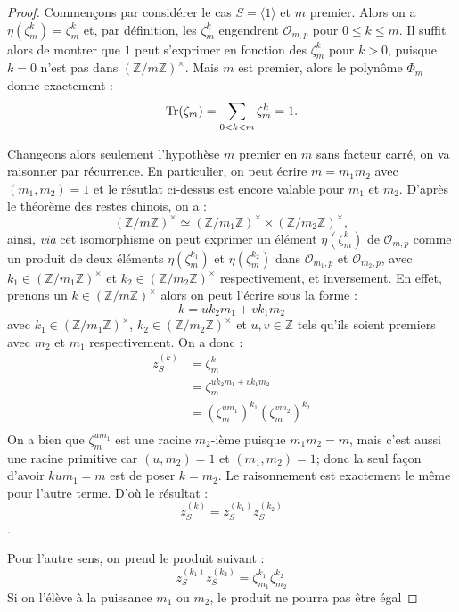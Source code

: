 \documentclass[a4paper]{article} %
\numberwithin{section}{part}
\numberwithin{equation}{section}
\newcommand\nroot[1]{\textit{#1}-ième}
\newcommand\zmodninv[1]{(\mathbb{Z}/#1\mathbb{Z})^{\times}}
\newcommand\EO{\mathcal{O}}
\begin{document}
\begin{proof}

Commençons par considérer le cas $S = \langle1\rangle$ et $m$ premier. Alors on 
a $\eta(\zeta_m^k) = \zeta_m^k$ et, par définition, les $\zeta_m^k$ engendrent 
$\EO_{m,p}$ pour $0 \leq k\leq m$. Il suffit alors de montrer que $1$ peut 
s'exprimer en fonction des $\zeta_m^k$ pour $k > 0$, puisque $k = 0$ n'est pas 
dans $\zmodninv{m}$. Mais $m$ est premier, alors le polynôme $\Phi_m$ 
donne exactement :
\begin{equation}
\textup{Tr}(\zeta_m) = \sum_{0 < k < m}{\zeta_m^k} = 1.
\end{equation}

Changeons alors seulement l'hypothèse $m$ premier en $m$ sans facteur carré, on 
va raisonner par récurrence. En particulier, on peut écrire $m = m_1m_2$ avec 
$(m_1,m_2) = 1$ et le résutlat ci-dessus est encore valable pour $m_1$ et 
$m_2$. D'après le théorème des restes chinois, on a :
\[\zmodninv{m} \simeq \zmodninv{m_1} \times \zmodninv{m_2},\]
ainsi, \textit{via} cet isomorphisme on peut exprimer un élément
$\eta(\zeta_m^k)$ de $\EO_{m,p}$ comme un produit de deux éléments
$\eta(\zeta_m^{k_1})$ et $\eta(\zeta_m^{k_2})$ dans $\EO_{m_1,p}$ et 
$\EO_{m_2,p}$, avec $k_1\in\zmodninv{m_1}$ et $k_2\in\zmodninv{m_2}$ 
respectivement, et inversement.
\iffalse
En effet, prenons un $k\in\zmodninv{m}$ alors on peut l'écrire sous la forme :
\[k = uk_2m_1 + vk_1m_2\]
avec $k_1\in\zmodninv{m_1}$, $k_2\in\zmodninv{m_2}$ et $u,v\in\mathbb{Z}$ tels 
qu'ils soient premiers avec $m_2$ et $m_1$ respectivement. On a donc :
\begin{align*}
z_S^{(k)} &= \zeta_m^k\\
&= \zeta_m^{uk_2m_1 + vk_1m_2}\\
&= (\zeta_m^{um_1})^{k_1}(\zeta_m^{vm_2})^{k_2}\\
\end{align*}
On a bien que $\zeta_m^{um_1}$ est une racine \nroot{$m_2$} puisque 
$m_1m_2 = m$, mais c'est aussi une racine primitive car $(u,m_2) = 1$ et 
$(m_1, m_2) = 1$; donc la seul façon d'avoir $kum_1 = m$ est de poser $k = m_2$.
Le raisonnement est exactement le même pour l'autre terme. D'où le résultat :
\[z_S^{(k)} = z_S^{(k_1)}z_S^{(k_2)}\].\par
Pour l'autre sens, on prend le produit suivant :
\[z_S^{(k_1)}z_S^{(k_2)} = \zeta_{m_1}^{k_1}\zeta_{m_2}^{k_2}\]
Si on l'élève à la puissance $m_1$ ou $m_2$, le produit ne pourra pas être égal 

\end{proof}
\end{document}
